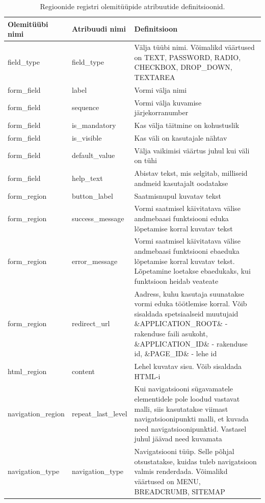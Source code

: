 \documentclass[a4paper,12pt]{article} %
\begin{document}
\begin{table}[H]
\centering
\caption{Regioonide registri olemitüüpide atribuutide definitsioonid.}
\label{table_er_regioonide_registri_olemitüüpide_atribuutide_definitsioonid}
\begin{tabular}{|p{4cm}|p{4cm}|p{7cm}|}
\hline
\rowcolor{rowgray}
Olemitüübi nimi & Atribuudi nimi & Definitsioon \\ \hline
field\_type & field\_type & Välja tüübi nimi. Võimalikd väärtused on TEXT, PASSWORD, RADIO, CHECKBOX, DROP\_DOWN, TEXTAREA \\ \hline
form\_field & label & Vormi välja nimi \\ \hline
form\_field & sequence & Vormi välja kuvamise järjekorranumber \\ \hline
form\_field & is\_mandatory & Kas välja täitmine on kohustuslik \\ \hline
form\_field & is\_visible & Kas väli on kasutajale nähtav \\ \hline
form\_field & default\_value & Välja vaikimisi väärtus juhul kui väli on tühi \\ \hline
form\_field & help\_text & Abistav tekst, mis selgitab, milliseid andmeid kasutajalt oodatakse \\ \hline
form\_region & button\_label & Saatmisnupul kuvatav tekst \\ \hline
form\_region & success\_message & Vormi saatmisel käivitatava välise andmebaasi funktsiooni eduka lõpetamise korral kuvatav tekst \\ \hline
form\_region & error\_message & Vormi saatmisel käivitatava välise andmebaasi funktsiooni ebaeduka lõpetamise korral kuvatav tekst. Lõpetamine loetakse ebaedukaks, kui funktsioon heidab veateate  \\ \hline
form\_region & redirect\_url & Aadress, kuhu kasutaja suunatakse vormi eduka töötlemise korral. Võib sisaldada spetsiaalseid muutujaid \&APPLICATION\_ROOT\& - rakenduse faili asukoht, \&APPLICATION\_ID\& - rakenduse id, \&PAGE\_ID\& - lehe id \\ \hline
html\_region & content & Lehel kuvatav sisu. Võib sisaldada HTML-i \\ \hline
navigation\_region & repeat\_last\_level & Kui navigatsiooni sügavamatele elementidele pole loodud vastavat malli, siis kasutatakse viimast navigatsioonipunkti malli, et kuvada need navigatsioonipunktid. Vastasel juhul jäävad need kuvamata  \\ \hline
navigation\_type & navigation\_type & Navigatsiooni tüüp. Selle põhjal otsustatakse, kuidas tuleb navigatsioon valmis renderdada. Võimalikd väärtused on MENU, BREADCRUMB, SITEMAP \\ \hline

\end{tabular}
\end{table}
\end{document}
